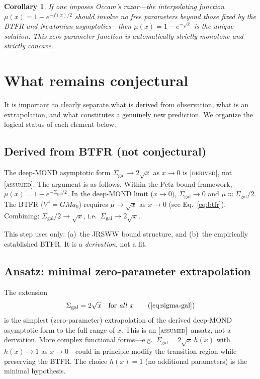 \documentclass[prd,twocolumn,superscriptaddress,longbibliography,floatfix]{revtex4-2}
\newtheorem{corollary}[theorem]{Corollary}
\newcommand{\derived}{\textsc{[derived]}}
\newcommand{\assumed}{\textsc{[assumed]}}
\begin{document}
\begin{corollary}
\label{cor:occam}
If one imposes Occam's razor---the interpolating function
$\mu(x) = 1 - e^{-f(x)/2}$ should involve no free parameters beyond
those fixed by the BTFR and Newtonian asymptotics---then
$\mu(x) = 1 - e^{-\sqrt{x}}$ is the unique solution.  This
zero-parameter function is automatically strictly monotone and
strictly concave.
\end{corollary}

\section{What remains conjectural}
\label{sec:conjecture}

It is important to clearly separate what is derived from observation,
what is an extrapolation, and what constitutes a genuinely new prediction.
We organize the logical status of each element below.

\subsection{Derived from BTFR (not conjectural)}

The deep-MOND asymptotic form $\Sigma_{\mathrm{gal}} \to 2\sqrt{x}$
as $x \to 0$ is \derived, not \assumed. The argument is as follows.
Within the Petz bound framework, $\mu(x) = 1 - e^{-\Sigma_{\mathrm{gal}}/2}$.
In the deep-MOND limit ($x \to 0$), $\Sigma_{\mathrm{gal}} \to 0$
and $\mu \approx \Sigma_{\mathrm{gal}}/2$.
The BTFR ($V^4 = GMa_0$) requires $\mu \to \sqrt{x}$ as $x \to 0$
(see Eq.~\eqref{eq:btfr}).
Combining: $\Sigma_{\mathrm{gal}}/2 \to \sqrt{x}$, i.e.\
$\Sigma_{\mathrm{gal}} \to 2\sqrt{x}$.

This step uses only: (a)~the JRSWW bound structure, and
(b)~the empirically established BTFR.
It is a \emph{derivation}, not a fit.

\subsection{Ansatz: minimal zero-parameter extrapolation}

The extension
\begin{equation}
  \Sigma_{\mathrm{gal}} = 2\sqrt{x}
  \quad \text{for \emph{all} } x
  \tag{\ref{eq:sigma-gal}}
\end{equation}
is the simplest (zero-parameter) extrapolation of the derived
deep-MOND asymptotic form to the full range of $x$.
This is an \assumed\ ansatz, not a derivation.
More complex functional forms---e.g.\
$\Sigma_{\mathrm{gal}} = 2\sqrt{x}\,h(x)$ with $h(x) \to 1$ as
$x \to 0$---could in principle modify the transition region while
preserving the BTFR.
The choice $h(x) = 1$ (no additional parameters) is the minimal
hypothesis.
\end{document}
